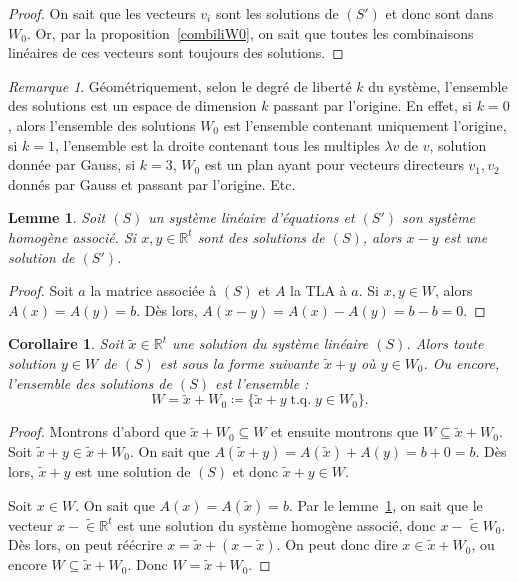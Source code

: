 \documentclass{article}
\DeclareMathOperator{\tq}{\text{ t.q. }}
\newcommand{\R}{\mathbb R}
\newtheorem{cor}[thm]{Corollaire}
\newtheorem{lem}[thm]{Lemme}
\theoremstyle{definition}
\theoremstyle{remark}
\newtheorem*{rmq}{Remarque}
\begin{document}
		\begin{proof} On sait que les vecteurs $v_i$ sont les solutions de $(S')$ et donc sont dans $W_0$. Or, par la proposition~\ref{combiliW0}, on sait que toutes les
		combinaisons linéaires de ces vecteurs sont toujours des solutions. \end{proof}

		\begin{rmq} Géométriquement, selon le degré de liberté $k$ du système, l'ensemble des solutions est un espace de dimension $k$ passant par l'origine. En effet, si
		$k=0$, alors l'ensemble des solutions $W_0$ est l'ensemble contenant uniquement l'origine, si $k=1$, l'ensemble est la droite contenant tous les multiples $\lambda v$
		de $v$, solution donnée par Gauss, si $k=3$, $W_0$ est un plan ayant pour vecteurs directeurs $v_1, v_2$ donnés par Gauss et passant par l'origine. Etc. \end{rmq}

		\begin{lem}\label{W-W=W_0} Soit $(S)$ un système linéaire d'équations et $(S')$ son système homogène associé. Si $x, y \in \R^t$ sont des solutions de $(S)$,
		alors $x-y$ est une solution de $(S')$. \end{lem}

		\begin{proof} Soit $a$ la matrice associée à $(S)$ et $A$ la TLA à $a$. Si $x, y \in W$, alors $A(x) = A(y) = b$. Dès lors, $A(x-y) = A(x) - A(y) = b-b = 0$. \end{proof}

		\begin{cor} Soit $\widetilde x \in \R^t$ une solution du système linéaire $(S)$. Alors toute solution $y \in W$ de $(S)$ est sous la forme suivante $\widetilde x + y$
		où $y \in W_0$. Ou encore, l'ensemble des solutions de $(S)$ est l'ensemble : \[W = \widetilde x + W_0 \coloneqq \{\widetilde x + y \tq y \in W_0\}.\] \end{cor}

		\begin{proof} Montrons d'abord que $\widetilde x + W_0 \subseteq W$ et ensuite montrons que $W \subseteq \widetilde x + W_0$. Soit
		$\widetilde x + y \in \widetilde x + W_0$. On sait que $A(\widetilde x + y) = A(\widetilde x) + A(y) = b + 0 = b$. Dès lors, $\widetilde x + y$ est une solution de $(S)$
		et donc $\widetilde x + y \in W$.

		Soit $x \in W$. On sait que $A(x) = A(\widetilde x) = b$. Par le lemme~\ref{W-W=W_0}, on sait que le vecteur $x-\widetilde \in \R^t$ est une solution du système
		homogène associé, donc $x-\widetilde \in W_0$. Dès lors, on peut réécrire $x = \widetilde x + (x-\widetilde x)$. On peut donc dire $x \in \widetilde x + W_0$, ou
		encore $W \subseteq \widetilde x + W_0$. Donc $W = \widetilde x + W_0$. \end{proof}
\end{document}
